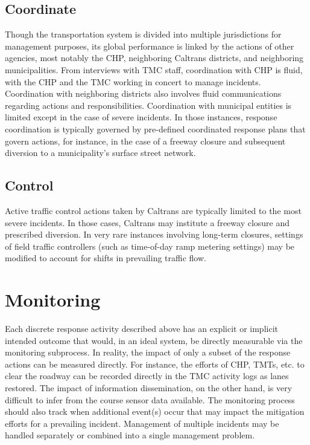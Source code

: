 \documentclass[12pt]{report}
\newcounter{time}
\begin{document}
\subsection{Coordinate}
\label{sec:coordinate}

Though the transportation system is divided into multiple jurisdictions for
management purposes, its global performance is linked by the actions of other
agencies, most notably the \ac{CHP}, neighboring Caltrans districts, and neighboring
municipalities.  From interviews with \ac{TMC} staff, coordination with \ac{CHP} is fluid,
with the \ac{CHP} and the \ac{TMC} working in concert to manage incidents.  Coordination
with neighboring districts also involves fluid communications regarding actions
and responsibilities.  Coordination with municipal entities is limited except in
the case of severe incidents.  In those instances, response coordination is
typically governed by pre-defined coordinated response plans that govern
actions, for instance, in the case of a freeway closure and subsequent diversion
to a municipality's surface street network.


\subsection{Control}
\label{sec:control}

Active traffic control actions taken by Caltrans are typically limited to the
most severe incidents.  In those cases, Caltrans may institute a freeway closure
and prescribed diversion.  In very rare instances involving long-term closures,
settings of field traffic controllers (such as time-of-day ramp metering
settings) may be modified to account for shifts in prevailing traffic flow.


\section{Monitoring}
\label{sec:monitoring}

Each discrete response activity described above has an explicit or
implicit intended outcome that would, in an ideal system, be directly
measurable via the monitoring subprocess.  In reality, the impact of
only a subset of the response actions can be measured directly.  For
instance, the efforts of \ac{CHP}, \acp{TMT}, etc. to clear the roadway
can be recorded directly in the \ac{TMC} activity logs as lanes
restored.  The impact of information dissemination, on the other hand,
is very difficult to infer from the course sensor data available.  The
monitoring process should also track when additional event(s) occur
that may impact the mitigation efforts for a prevailing incident.
Management of multiple incidents may be handled separately or combined
into a single management problem.
\end{document}
